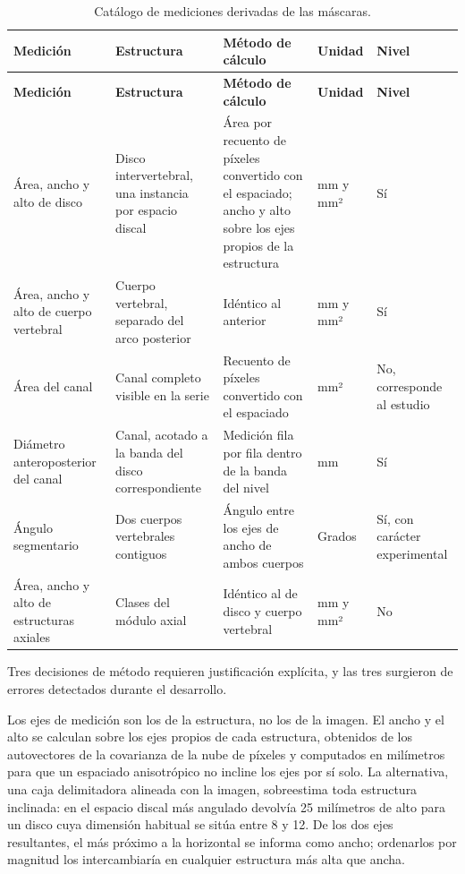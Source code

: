 {\scriptsize
\setlength{\LTleft}{0pt}
\setlength{\LTright}{0pt}
\setlength{\tabcolsep}{3pt}
\renewcommand{\arraystretch}{1.18}
\begin{longtable}{>{\raggedright\arraybackslash}p{} >{\raggedright\arraybackslash}p{} >{\raggedright\arraybackslash}p{} >{\raggedright\arraybackslash}p{} >{\raggedright\arraybackslash}p{}}
\caption{Catálogo de mediciones derivadas de las máscaras.}\label{tab:cap-mediciones-mascaras}\\
\hline
\textbf{Medición} & \textbf{Estructura} & \textbf{Método de cálculo} & \textbf{Unidad} & \textbf{Nivel} \\
\hline
\endfirsthead
\hline
\textbf{Medición} & \textbf{Estructura} & \textbf{Método de cálculo} & \textbf{Unidad} & \textbf{Nivel} \\
\hline
\endhead
\hline
\endfoot
Área, ancho y alto de disco & Disco intervertebral, una instancia por espacio discal & Área por recuento de píxeles convertido con el espaciado; ancho y alto sobre los ejes propios de la estructura & mm y mm² & Sí \\
Área, ancho y alto de cuerpo vertebral & Cuerpo vertebral, separado del arco posterior & Idéntico al anterior & mm y mm² & Sí \\
Área del canal & Canal completo visible en la serie & Recuento de píxeles convertido con el espaciado & mm² & No, corresponde al estudio \\
Diámetro anteroposterior del canal & Canal, acotado a la banda del disco correspondiente & Medición fila por fila dentro de la banda del nivel & mm & Sí \\
Ángulo segmentario & Dos cuerpos vertebrales contiguos & Ángulo entre los ejes de ancho de ambos cuerpos & Grados & Sí, con carácter experimental \\
Área, ancho y alto de estructuras axiales & Clases del módulo axial & Idéntico al de disco y cuerpo vertebral & mm y mm² & No \\
\hline
\end{longtable}
}

Tres decisiones de método requieren justificación explícita, y las tres surgieron de errores detectados durante el desarrollo.

Los ejes de medición son los de la estructura, no los de la imagen. El ancho y el alto se calculan sobre los ejes propios de cada estructura, obtenidos de los autovectores de la covarianza de la nube de píxeles y computados en milímetros para que un espaciado anisotrópico no incline los ejes por sí solo. La alternativa, una caja delimitadora alineada con la imagen, sobreestima toda estructura inclinada: en el espacio discal más angulado devolvía 25 milímetros de alto para un disco cuya dimensión habitual se sitúa entre 8 y 12. De los dos ejes resultantes, el más próximo a la horizontal se informa como ancho; ordenarlos por magnitud los intercambiaría en cualquier estructura más alta que ancha.

